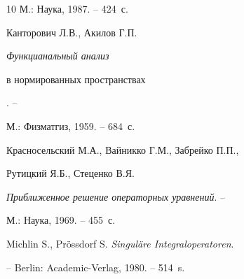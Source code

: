 \begin{thebibliography}{10}
М.: Наука, 1987. -- 424~с.





 Канторович Л.В., Акилов Г.П. {\em Функцианальный анализ


в нормированных пространствах}. --


М.: Физматгиз, 1959. -- 684~с.





 Красносельский М.А., Вайникко Г.М., Забрейко П.П.,


Рутицкий Я.Б., Стеценко В.Я.


{\em Приближенное решение операторных уравнений}. --


М.: Наука, 1969. -- 455~с.







Michlin S., Pr\"ossdorf S. {\em Singul\"are Integraloperatoren}.


-- Berlin: Academic-Verlag, 1980. -- 514~s.





\end{thebibliography}





\vskip 2cm












\label{end}





